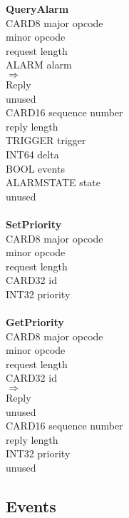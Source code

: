 \begin{tabbing}
\tabstopsC
{\bf QueryAlarm}\\
		\> CARD8	\> major opcode \\
	\> 1			\> minor opcode\footnotemark[1] \\
	\> 2			\> request length \\
		\> ALARM	\> alarm \\
$\Rightarrow$\\
	\> 1			\> Reply \\
		\>		\> unused \\
		\> CARD16	\> sequence number \\
				\> reply length \\
		\> TRIGGER	\> trigger \\
		\> INT64	\> delta \\
		\> BOOL		\> events \\
		\> ALARMSTATE	\> state \\
		\>		\> unused \\
\\
{\bf SetPriority}\\
		\> CARD8	\> major opcode \\
	\> 1			\> minor opcode \\
				\> request length \\
		\> CARD32	\> id \\
		\> INT32	\> priority \\
\\
{\bf GetPriority}\\
		\> CARD8	\> major opcode \\
	\> 1			\> minor opcode \\
				\> request length \\
		\> CARD32	\> id \\
$\Rightarrow$\\
	\> 1			\> Reply \\
		\>		\> unused \\
		\> CARD16	\> sequence number \\
				\> reply length \\
		\> INT32	\> priority \\
		\>		\> unused\\
\end{tabbing}

\subsection{Events}

